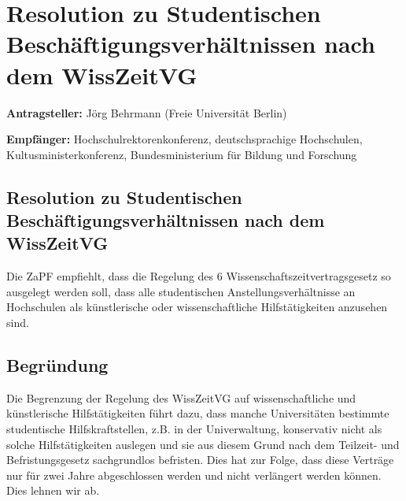\documentclass[draft,12pt,oneside]{scrartcl}
\begin{document}
\section*{Resolution zu Studentischen Beschäftigungsverhältnissen nach dem WissZeitVG}

\textbf{Antragsteller:} Jörg Behrmann (Freie Universität Berlin)

\textbf{Empfänger:} Hochschulrektorenkonferenz, deutschsprachige Hochschulen,
Kultusministerkonferenz, Bundesministerium für Bildung und Forschung

\subsection*{Resolution zu Studentischen Beschäftigungsverhältnissen nach dem WissZeitVG}

Die ZaPF empfiehlt, dass die Regelung des \textsection{}6
Wissenschaftszeitvertragsgesetz so ausgelegt werden soll, dass alle
studentischen Anstellungsverhältnisse an Hochschulen als künstlerische oder
wissenschaftliche Hilfstätigkeiten anzusehen sind.

\subsection*{Begründung}

Die Begrenzung der Regelung des WissZeitVG auf wissenschaftliche und
künstlerische Hilfstätigkeiten führt dazu, dass manche Universitäten bestimmte
studentische Hilfskraftstellen, z.B. in der Univerwaltung, konservativ nicht als
solche Hilfstätigkeiten auslegen und sie aus diesem Grund nach dem Teilzeit- und
Befristungsgesetz sachgrundlos befristen. Dies hat zur Folge, dass diese
Verträge nur für zwei Jahre abgeschlossen werden und nicht verlängert werden
können. Dies lehnen wir ab.
\end{document}
